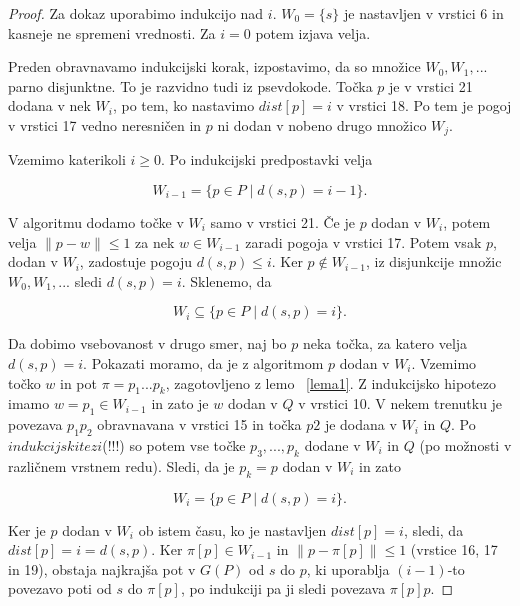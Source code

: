\documentclass[a4paper, 12pt]{book}
\begin{document}
\begin{proof}
Za dokaz uporabimo indukcijo nad $i$. $W_0 = \{s\}$ je nastavljen v vrstici 6 in kasneje ne spremeni vrednosti. Za $i = 0$ potem izjava velja.

Preden obravnavamo indukcijski korak, izpostavimo, da so množice $W_0, W_1,...$ parno disjunktne. To je razvidno tudi iz psevdokode. Točka $p$  je v vrstici 21 dodana v nek $W_i$, po tem, ko nastavimo $dist[p] = i$ v vrstici 18. Po tem je pogoj v vrstici 17 vedno neresničen in $p$ ni dodan v nobeno drugo množico $W_j$.

Vzemimo katerikoli $i \ge 0$. Po indukcijski predpostavki velja

\begin{equation}
W_{i-1} = \{p \in P \mid d(s,p) = i - 1\}.
\end{equation}

V algoritmu dodamo točke v $W_i$ samo v vrstici 21. Če je $p$ dodan v $W_i$, potem velja $\|p - w\| \leq 1$ za nek $w \in W_{i-1}$ zaradi pogoja v vrstici 17. Potem vsak $p$, dodan v $W_i$, zadostuje pogoju $d(s,p) \leq i$. Ker $p \notin W_{i-1}$, iz disjunkcije množic $W_0, W_1,...$ sledi $d(s,p) = i$. Sklenemo, da

\begin{equation}
W_i \subseteq \{p \in P \mid d(s,p) = i\}.
\end{equation}

Da dobimo vsebovanost v drugo smer, naj bo $p$ neka točka, za katero velja $d(s,p) = i$. Pokazati moramo, da je z algoritmom $p$ dodan v $W_i$. Vzemimo točko $w$ in pot $\pi = p_1...p_k$, zagotovljeno z lemo ~\ref{lema1}. Z indukcijsko hipotezo imamo $w = p_1 \in W_{i-1}$ in zato je $w$ dodan v $Q$ v vrstici 10. V nekem trenutku je povezava $p_1p_2$ obravnavana v vrstici 15 in točka $p2$ je dodana v $W_i$ in $Q$. Po $indukcijski tezi$(!!!) so potem vse točke $p_3,...,p_k$ dodane v $W_i$ in $Q$ (po možnosti v različnem vrstnem redu). Sledi, da je $p_k = p$ dodan v $W_i$ in zato

\begin{equation}
W_i = \{p \in P \mid d(s,p) = i \}.
\end{equation}

Ker je $p$ dodan v $W_i$ ob istem času, ko je nastavljen $dist[p] = i$, sledi, da $dist[p] = i = d(s,p)$. Ker $\pi[p] \in W_{i-1}$ in $\|p - \pi[p] \| \leq 1$ (vrstice 16, 17 in 19), obstaja najkrajša pot v $G(P)$ od $s$ do $p$, ki uporablja $(i-1)$-to povezavo poti od $s$ do $\pi[p]$, po indukciji pa ji sledi povezava $\pi[p]p$.
\end{proof}
\end{document}
